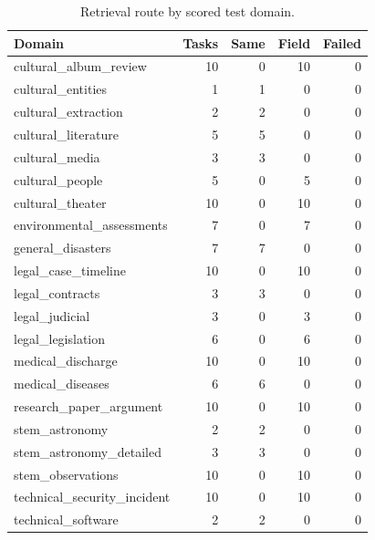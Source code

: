 \begin{table}[!htbp]
\centering
\caption{Retrieval route by scored test domain.}
\label{tab:retrieval-domain-route}
\scriptsize
\begin{tabularx}{\linewidth}{@{}>{\raggedright\arraybackslash}Xrrrr@{}}
\toprule
Domain & Tasks & Same & Field & Failed \\
\midrule
cultural\_album\_review & 10 & 0 & 10 & 0 \\
cultural\_entities & 1 & 1 & 0 & 0 \\
cultural\_extraction & 2 & 2 & 0 & 0 \\
cultural\_literature & 5 & 5 & 0 & 0 \\
cultural\_media & 3 & 3 & 0 & 0 \\
cultural\_people & 5 & 0 & 5 & 0 \\
cultural\_theater & 10 & 0 & 10 & 0 \\
environmental\_assessments & 7 & 0 & 7 & 0 \\
general\_disasters & 7 & 7 & 0 & 0 \\
legal\_case\_timeline & 10 & 0 & 10 & 0 \\
legal\_contracts & 3 & 3 & 0 & 0 \\
legal\_judicial & 3 & 0 & 3 & 0 \\
legal\_legislation & 6 & 0 & 6 & 0 \\
medical\_discharge & 10 & 0 & 10 & 0 \\
medical\_diseases & 6 & 6 & 0 & 0 \\
research\_paper\_argument & 10 & 0 & 10 & 0 \\
stem\_astronomy & 2 & 2 & 0 & 0 \\
stem\_astronomy\_detailed & 3 & 3 & 0 & 0 \\
stem\_observations & 10 & 0 & 10 & 0 \\
technical\_security\_incident & 10 & 0 & 10 & 0 \\
technical\_software & 2 & 2 & 0 & 0 \\
\bottomrule
\end{tabularx}
\end{table}

